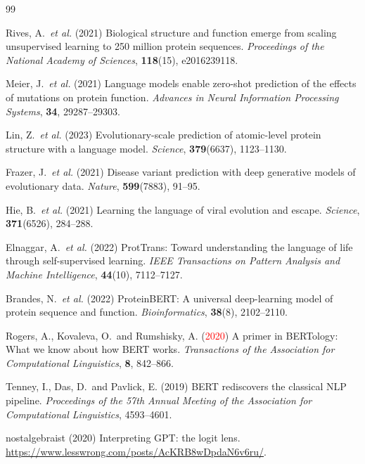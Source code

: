 \documentclass[numbered,webpdf,modern,large]{oup-authoring-template}
\newcommand{\rev}[1]{\textcolor{red}{#1}}
\begin{document}
\newpage
\begin{thebibliography}{99}


Rives, A.\ \textit{et al.} (2021)
Biological structure and function emerge from scaling unsupervised learning to 250
million protein sequences.
\textit{Proceedings of the National Academy of Sciences}, \textbf{118}(15), e2016239118.

Meier, J.\ \textit{et al.} (2021)
Language models enable zero-shot prediction of the effects of mutations on protein
function.
\textit{Advances in Neural Information Processing Systems}, \textbf{34}, 29287--29303.

Lin, Z.\ \textit{et al.} (2023)
Evolutionary-scale prediction of atomic-level protein structure with a language model.
\textit{Science}, \textbf{379}(6637), 1123--1130.

Frazer, J.\ \textit{et al.} (2021)
Disease variant prediction with deep generative models of evolutionary data.
\textit{Nature}, \textbf{599}(7883), 91--95.

Hie, B.\ \textit{et al.} (2021)
Learning the language of viral evolution and escape.
\textit{Science}, \textbf{371}(6526), 284--288.

Elnaggar, A.\ \textit{et al.} (2022)
ProtTrans: Toward understanding the language of life through self-supervised learning.
\textit{IEEE Transactions on Pattern Analysis and Machine Intelligence}, \textbf{44}(10),
7112--7127.

Brandes, N.\ \textit{et al.} (2022)
ProteinBERT: A universal deep-learning model of protein sequence and function.
\textit{Bioinformatics}, \textbf{38}(8), 2102--2110.

Rogers, A., Kovaleva, O.\ and Rumshisky, A. (\rev{2020})
A primer in BERTology: What we know about how BERT works.
\textit{Transactions of the Association for Computational Linguistics}, \textbf{8},
842--866.

Tenney, I., Das, D.\ and Pavlick, E. (2019)
BERT rediscovers the classical NLP pipeline.
\textit{Proceedings of the 57th Annual Meeting of the Association for Computational
Linguistics}, 4593--4601.

nostalgebraist (2020)
Interpreting GPT: the logit lens.
\url{https://www.lesswrong.com/posts/AcKRB8wDpdaN6v6ru/}.


\end{thebibliography}
\end{document}
